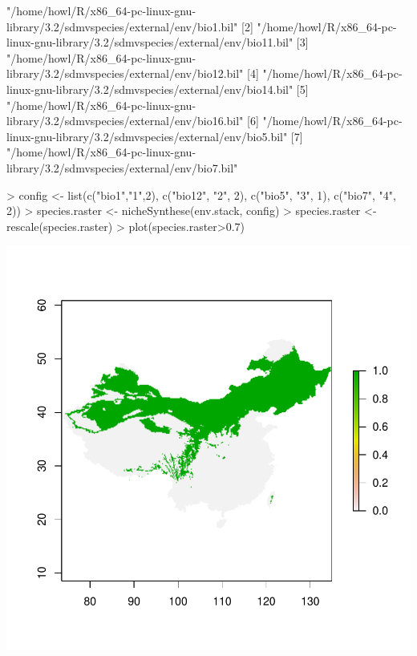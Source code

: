 \documentclass{report}
\begin{document}
\begin{Schunk}
\begin{Soutput}
[1] "/home/howl/R/x86_64-pc-linux-gnu-library/3.2/sdmvspecies/external/env/bio1.bil" 
[2] "/home/howl/R/x86_64-pc-linux-gnu-library/3.2/sdmvspecies/external/env/bio11.bil"
[3] "/home/howl/R/x86_64-pc-linux-gnu-library/3.2/sdmvspecies/external/env/bio12.bil"
[4] "/home/howl/R/x86_64-pc-linux-gnu-library/3.2/sdmvspecies/external/env/bio14.bil"
[5] "/home/howl/R/x86_64-pc-linux-gnu-library/3.2/sdmvspecies/external/env/bio16.bil"
[6] "/home/howl/R/x86_64-pc-linux-gnu-library/3.2/sdmvspecies/external/env/bio5.bil" 
[7] "/home/howl/R/x86_64-pc-linux-gnu-library/3.2/sdmvspecies/external/env/bio7.bil" 
\end{Soutput}
\begin{Sinput}
> config <- list(c("bio1","1",2), c("bio12", "2", 2), c("bio5", "3", 1), c("bio7", "4", 2))
> species.raster <- nicheSynthese(env.stack, config)
> species.raster <- rescale(species.raster)
> plot(species.raster>0.7)
\end{Sinput}
\end{Schunk}
\includegraphics{sdmvspecies-niche_Synthsis_Method}
\end{document}
